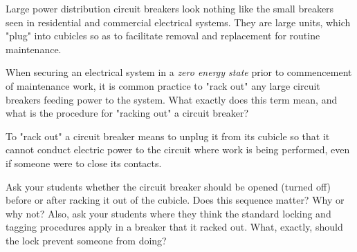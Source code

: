 

Large power distribution circuit breakers look nothing like the small breakers seen in residential and commercial electrical systems.  They are large units, which "plug" into cubicles so as to facilitate removal and replacement for routine maintenance.

When securing an electrical system in a {\it zero energy state} prior to commencement of maintenance work, it is common practice to "rack out" any large circuit breakers feeding power to the system.  What exactly does this term mean, and what is the procedure for "racking out" a circuit breaker?







To "rack out" a circuit breaker means to unplug it from its cubicle so that it cannot conduct electric power to the circuit where work is being performed, even if someone were to close its contacts.







Ask your students whether the circuit breaker should be opened (turned off) before or after racking it out of the cubicle.  Does this sequence matter?  Why or why not?  Also, ask your students where they think the standard locking and tagging procedures apply in a breaker that it racked out.  What, exactly, should the lock prevent someone from doing?




